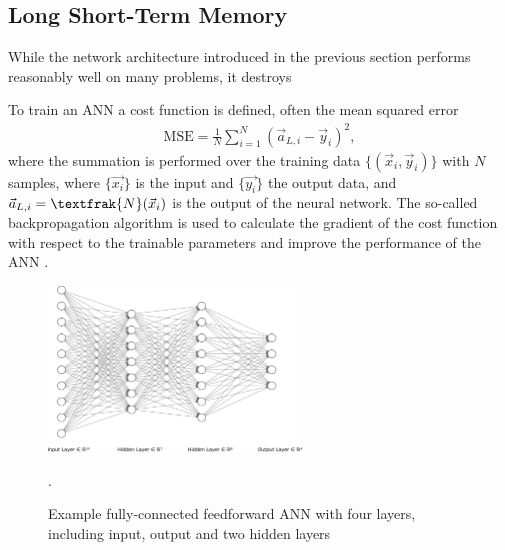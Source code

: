 \subsection{Long Short-Term Memory}
While the network architecture introduced in the previous section performs reasonably well on many problems, it destroys 

To train an ANN a cost function is defined, often the mean squared error 
\begin{align*}
	\mathrm{MSE} = \frac{1}{N} \sum_{i=1}^N (\vec{a}_{L, i} - \vec{y}_i)^2,
\end{align*}
where the summation is performed over the training data $\{(\vec{x}_i, \vec{y}_i)\}$ with $N$ samples, where $\{\vec{x_i}\}$ is the input and $\{\vec{y_i}\}$ the output data, and $\vec{a}_{L, i} = \textfrak{N}(\vec{x}_i)$ is the output of the neural network.
The so-called backpropagation algorithm is used to calculate the gradient of the cost function with respect to the trainable parameters and improve the performance of the ANN \cite{rumelhart1986learning, nielsenneural}.

\begin{figure}
	\centering
	\includegraphics[width=0.6\textwidth]{img/nn}
	\caption{Example fully-connected feedforward ANN with four layers, including input, output and two hidden layers \cite{LeNail2019}}.
	\label{nn}
\end{figure}